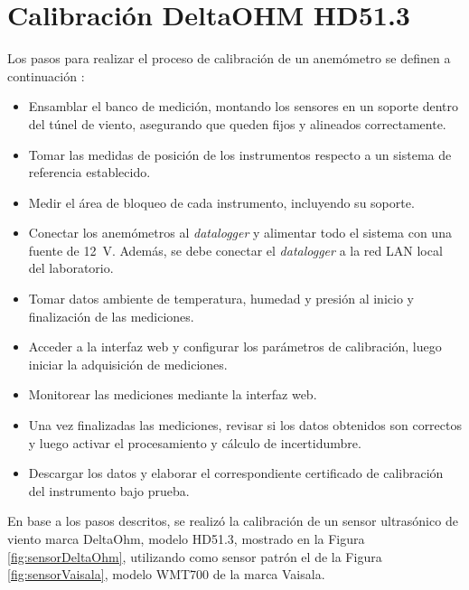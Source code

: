 \section{Calibración DeltaOHM HD51.3}\label{sec:calibDeltaOhm}

Los pasos para realizar el proceso de calibración de un anemómetro se definen a continuación \cite{ISO16622} \cite{IEC61400-12-1}  \cite{procedimientoSMNLaboratorio2024}:
\begin{itemize}
    \item Ensamblar el banco de medición, montando los sensores en un soporte dentro del túnel de viento, asegurando que queden fijos y alineados correctamente.
    \item Tomar las medidas de posición de los instrumentos respecto a un sistema de referencia establecido.
    \item Medir el área de bloqueo de cada instrumento, incluyendo su soporte.
    \item Conectar los anemómetros al \textit{datalogger} y alimentar todo el sistema con una fuente de \SI{12}{V}. Además, se debe conectar el \textit{datalogger} a la red LAN local del laboratorio.
    \item Tomar datos ambiente de temperatura, humedad y presión al inicio y finalización de las mediciones.
    \item Acceder a la interfaz web y configurar los parámetros de calibración, luego iniciar la adquisición de mediciones.
    \item Monitorear las mediciones mediante la interfaz web.
    \item Una vez finalizadas las mediciones, revisar si los datos obtenidos son correctos y luego activar el procesamiento y cálculo de incertidumbre.
    \item Descargar los datos y elaborar el correspondiente certificado de calibración del instrumento bajo prueba.
\end{itemize}



En base a los pasos descritos, se realizó la calibración de un sensor ultrasónico de viento marca DeltaOhm, modelo HD51.3, mostrado en la Figura \ref{fig:sensorDeltaOhm}, utilizando como sensor patrón el de la Figura \ref{fig:sensorVaisala}, modelo WMT700 de la marca Vaisala.

